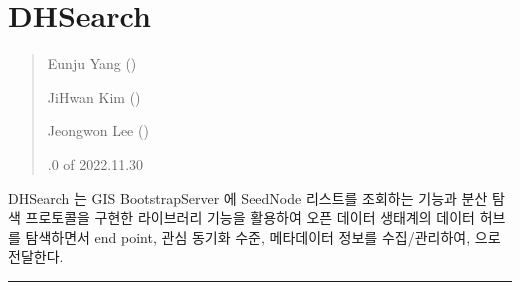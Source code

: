\documentclass[a4paper,10pt,english]{sphinxmanual}
\begin{document}
\section{DHSearch}
\label{\detokenize{_DHSearch:dhsearch}}\label{\detokenize{_DHSearch:id1}}\label{\detokenize{_DHSearch::doc}}\begin{quote}\begin{description}
\begin{DUlineblock}{0em}
\item[] Eunju Yang ()
\item[] JiHwan Kim ()
\item[] Jeongwon Lee ()
\end{DUlineblock}

.0 of 2022.11.30

\end{description}\end{quote}

\sphinxAtStartPar
DHSearch 는 GIS BootstrapServer 에 SeedNode 리스트를 조회하는 기능과 분산 탐색 프로토콜을 구현한 {\hyperref[\detokenize{_kademlia:kademlia}]{}} 라이브러리 기능을 활용하여
오픈 데이터 생태계의 데이터 허브를 탐색하면서 end point, 관심 동기화 수준, 메타데이터 정보를 수집/관리하여, {\hyperref[\detokenize{_DHDaemon:dhdaemon}]{}} 으로 전달한다.



\bigskip\hrule\bigskip

\end{document}
